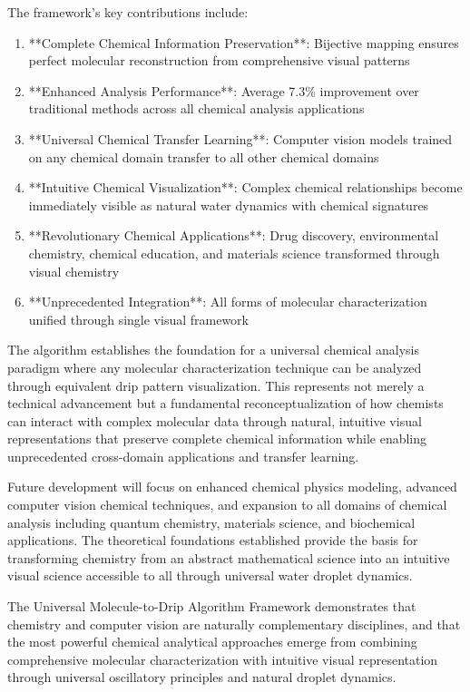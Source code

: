 \documentclass[12pt,a4paper]{article}
\begin{document}
\begin{algorithm}
\begin{algorithmic}[1]
\begin{table}[H]
\begin{table}[H]
\begin{table}[H]
{{{The framework's key contributions include:

\begin{enumerate}
\item **Complete Chemical Information Preservation**: Bijective mapping ensures perfect molecular reconstruction from comprehensive visual patterns
\item **Enhanced Analysis Performance**: Average 7.3\% improvement over traditional methods across all chemical analysis applications
\item **Universal Chemical Transfer Learning**: Computer vision models trained on any chemical domain transfer to all other chemical domains
\item **Intuitive Chemical Visualization**: Complex chemical relationships become immediately visible as natural water dynamics with chemical signatures
\item **Revolutionary Chemical Applications**: Drug discovery, environmental chemistry, chemical education, and materials science transformed through visual chemistry
\item **Unprecedented Integration**: All forms of molecular characterization unified through single visual framework
\end{enumerate}

The algorithm establishes the foundation for a universal chemical analysis paradigm where any molecular characterization technique can be analyzed through equivalent drip pattern visualization. This represents not merely a technical advancement but a fundamental reconceptualization of how chemists can interact with complex molecular data through natural, intuitive visual representations that preserve complete chemical information while enabling unprecedented cross-domain applications and transfer learning.

Future development will focus on enhanced chemical physics modeling, advanced computer vision chemical techniques, and expansion to all domains of chemical analysis including quantum chemistry, materials science, and biochemical applications. The theoretical foundations established provide the basis for transforming chemistry from an abstract mathematical science into an intuitive visual science accessible to all through universal water droplet dynamics.

The Universal Molecule-to-Drip Algorithm Framework demonstrates that chemistry and computer vision are naturally complementary disciplines, and that the most powerful chemical analytical approaches emerge from combining comprehensive molecular characterization with intuitive visual representation through universal oscillatory principles and natural droplet dynamics.

}}}
\end{table}
\end{table}
\end{table}
\end{algorithmic}
\end{algorithm}
\end{document}
